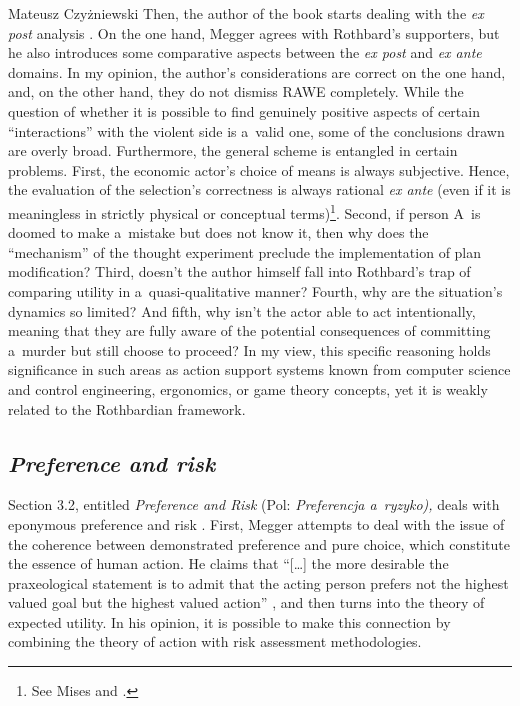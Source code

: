 \begin{newrevengenv}{Mateusz Czyżniewski}
Then, the author of the book starts dealing with the \textit{ex post} analysis 
\parencite[][pp.70–72]{megger_sprawiedliwosc_2021}. %
 On the one hand, Megger agrees with Rothbard's supporters, but he also introduces some comparative aspects between the \textit{ex post} and \textit{ex ante} domains. In my opinion, the author's considerations are correct on the one hand, and, on the other hand, they do not dismiss RAWE completely. While the question of whether it is possible to find genuinely positive aspects of certain ``interactions'' with the violent side is a~valid one, some of the conclusions drawn are overly broad. Furthermore, the general scheme is entangled in certain problems. First, the economic actor's choice of means is always subjective. Hence, the evaluation of the selection's correctness is always rational \textit{ex ante} (even if it is meaningless in strictly physical or conceptual terms)\footnote{See Mises 
\parencite*[][pp.13–23]{mises_human_1998} %
 and 
\parencite[][pp.264–271]{mises_theory_1997}.%
}. Second, if person A~is doomed to make a~mistake but does not know it, then why does the ``mechanism'' of the thought experiment preclude the implementation of plan modification? Third, doesn't the author himself fall into Rothbard's trap of comparing utility in a~quasi-qualitative manner? Fourth, why are the situation's dynamics so limited? And fifth, why isn't the actor able to act intentionally, meaning that they are fully aware of the potential consequences of committing a~murder but still choose to proceed? In my view, this specific reasoning holds significance in such areas as action support systems known from computer science and control engineering, ergonomics, or game theory concepts, yet it is weakly related to the Rothbardian framework.



\subsection{\itshape Preference and risk}



Section 3.2, entitled \textit{Preference and Risk} (Pol: \textit{Preferencja a~ryzyko),} deals with eponymous preference and risk 
\parencite[][pp.73–82]{megger_sprawiedliwosc_2021}. %
 First, Megger attempts to deal with the issue of the coherence between demonstrated preference and pure choice, which constitute the essence of human action. He claims that ``[…] the more desirable the praxeological statement is to admit that the acting person prefers not the highest valued goal but the highest valued action'' 
\parencite[][p.74]{megger_sprawiedliwosc_2021}, %
 and then turns into the theory of expected utility. In his opinion, it is possible to make this connection by combining the theory of action with risk assessment methodologies.




\end{newrevengenv}
